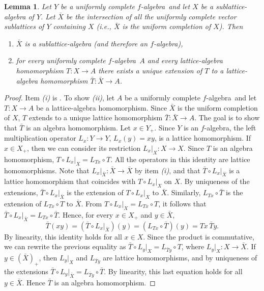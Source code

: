 \documentclass{amsart}
\theoremstyle{plain}
\newtheorem{lem}[thm]{Lemma}
\theoremstyle{definition}
\theoremstyle{remark}
\newcommand{\falg}{$f\!$-algebra}
\begin{document}
\begin{lem}\label{lem:ucfalg}
    Let $Y$ be a uniformly complete \falg\ and let $X$ be a
    sublattice-algebra of $Y$. Let $\bar{X}$ be the intersection of
    all the uniformly complete vector sublattices of $Y$ containing
    $X$ (i.e., $\bar{X}$ is the uniform completion of $X$). Then
    \begin{enumerate}
        \item $\bar{X}$ is a sublattice-algebra (and therefore an
            \falg),
        \item for every uniformly complete \falg\ $A$ and every
            lattice-algebra homomorphism $T\colon X\to A$ there exists a
            unique extension of $T$ to a lattice-algebra homomorphism
            $\bar{T}\colon \bar{X}\to A$.
    \end{enumerate}
\end{lem}
\begin{proof}
    Item \textit{(i)} is \cite[Lemma 2.1]{buskes_depagter_vanrooij1991}.
    To show \textit{(ii)}, let $A$ be a uniformly complete \falg\ and
    let $T\colon X\to A$ be a lattice-algebra homomorphism. Since $\bar{X}$ is
    the uniform completion of $X$, $T$ extends to a unique lattice
    homomorphism $\bar{T}\colon \bar{X}\to A$. The goal is to show
    that $\bar{T}$ is an algebra homomorphism. Let $x \in Y_+$. Since
    $Y$ is an \falg, the left multiplication operator $L_x\colon Y\to
    Y$, $L_x(y)=xy$, is a lattice homomorphism. If $x \in X_+$, then
    we can consider its restriction $L_x|_{X}\colon X\to X$. Since
    $T$ is an algebra homomorphism, $T\circ L_x|_X=L_{Tx}\circ T$. All
    the operators in this identity are lattice homomorphisms. Note
    that $L_x|_{\bar{X}}\colon \bar{X}\to \bar{X}$ by item
    \textit{(i)}, and that $\bar{T}\circ L_x|_{\bar{X}}$ is a lattice
    homomorphism that coincides with $T\circ L_x|_{X}$ on $X$. By
    uniqueness of the extensions, $\bar{T}\circ L_x|_{\bar{X}}$ is the
    extension of $T\circ L_x|_X$ to $\bar{X}$. Similarly,
    $L_{Tx}\circ \bar{T}$ is the extension of
    $L_{Tx}\circ T$ to $\bar{X}$. From $T\circ L_x|_X=L_{Tx}\circ T$,
    it follows that $\bar{T}\circ L_x|_{\bar{X}}=L_{Tx}\circ \bar{T}$. Hence, for
    every $x \in X_+$ and $y \in \bar{X}$,
    \[
    \bar{T}(xy)=(\bar{T}\circ L_x|_{\bar{X}})(y)=(L_{Tx}\circ
    \bar{T})(y)=Tx\, \bar{T}y.
    \]
    By linearity, this identity holds for all $x \in X$. Since the
    product is commutative, we can rewrite the previous equality as
    $\bar{T}\circ L_y|_X=L_{\bar{T}y}\circ T$, where $L_y|_X\colon
    X\to \bar{X}$. If $y \in (\bar{X})_+$, then $L_y|_X$ and
    $L_{\bar{T}y}$ are lattice homomorphisms, and by uniqueness of the
    extensions $\bar{T}\circ L_y|_{\bar{X}}=L_{\bar{T}y}\circ
    \bar{T}$. By linearity, this last equation holds for all $y \in
    \bar{X}$. Hence $\bar{T}$ is an algebra homomorphism.
\end{proof}
\end{document}
